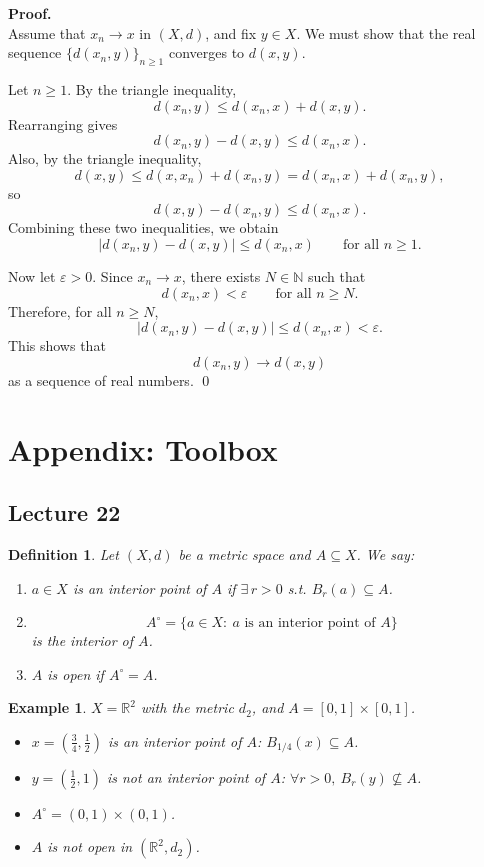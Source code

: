 \documentclass[12pt]{article}
\newtheorem{definition}{Definition}
\newtheorem{example}{Example}
\begin{document}
\textbf{Proof.}\\
Assume that $x_n\to x$ in $(X,d)$, and fix $y\in X$. We must show that the real sequence $\{d(x_n,y)\}_{n\ge 1}$ converges to $d(x,y)$.

Let $n\ge 1$. By the triangle inequality,
\[
d(x_n,y)\le d(x_n,x)+d(x,y).
\]
Rearranging gives
\[
d(x_n,y)-d(x,y)\le d(x_n,x).
\]
Also, by the triangle inequality,
\[
d(x,y)\le d(x,x_n)+d(x_n,y)=d(x_n,x)+d(x_n,y),
\]
so
\[
d(x,y)-d(x_n,y)\le d(x_n,x).
\]
Combining these two inequalities, we obtain
\[
\bigl|d(x_n,y)-d(x,y)\bigr|\le d(x_n,x)
\qquad \text{for all } n\ge 1.
\]

Now let $\varepsilon>0$. Since $x_n\to x$, there exists $N\in\mathbb{N}$ such that
\[
d(x_n,x)<\varepsilon
\qquad \text{for all } n\ge N.
\]
Therefore, for all $n\ge N$,
\[
\bigl|d(x_n,y)-d(x,y)\bigr|\le d(x_n,x)<\varepsilon.
\]
This shows that
\[
d(x_n,y)\to d(x,y)
\]
as a sequence of real numbers.
\qed

\newpage
\appendix
\section*{Appendix: Toolbox}

\subsection*{Lecture 22}

\begin{definition}
Let $(X,d)$ be a metric space and $A\subseteq X$. We say:
\begin{enumerate}[label=\textbf{(\arabic*)}]
  \item $a\in X$ is an interior point of $A$ if $\exists\, r>0$ s.t.
  $B_r(a)\subseteq A$.
  \item
  \[
  A^\circ=\{a\in X:\ a \text{ is an interior point of } A\}
  \]
  is the interior of $A$.
  \item $A$ is open if $A^\circ=A$.
\end{enumerate}
\end{definition}

\begin{example}
$X=\mathbb{R}^2$ with the metric $d_2$, and
$A=[0,1]\times[0,1]$.
\begin{itemize}
  \item $x=\left(\frac{3}{4},\frac{1}{2}\right)$ is an interior point of $A$:
  $B_{1/4}(x)\subseteq A$.
  \item $y=\left(\frac{1}{2},1\right)$ is not an interior point of $A$:
  $\forall r>0,\ B_r(y)\nsubseteq A$.
  \item $A^\circ=(0,1)\times(0,1)$.
  \item $A$ is not open in $(\mathbb{R}^2,d_2)$.
\end{itemize}
\end{example}
\end{document}
